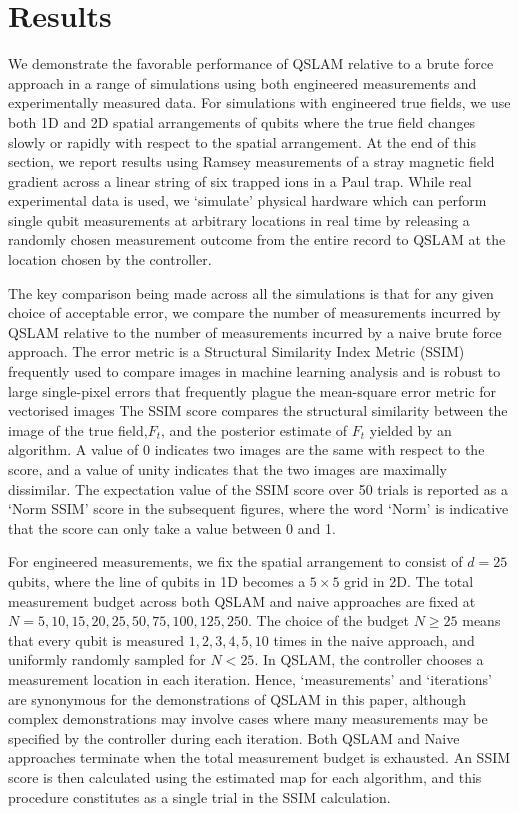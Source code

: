 \section{Results \label{sec:results}}

We demonstrate the favorable performance of QSLAM relative to a brute force approach in a range of simulations using both engineered measurements and  experimentally measured data. For simulations with engineered true fields, we use both 1D and 2D spatial arrangements of qubits where the true field changes slowly or rapidly with respect to the spatial arrangement. At the end of this section, we report results using Ramsey measurements of a stray magnetic field gradient across a linear string of six trapped ions in a Paul trap. While real experimental data is used, we `simulate' physical hardware which can perform single qubit measurements at arbitrary locations in real time by releasing a randomly chosen measurement outcome from the entire record to QSLAM at the location chosen by the controller.

The key comparison being made across all the simulations is that for any given choice of acceptable error, we compare the number of measurements incurred by QSLAM relative to the number of measurements incurred by a naive brute force approach. The error metric is a Structural Similarity Index Metric (SSIM) frequently used to compare images in machine learning analysis and is robust to large single-pixel errors that frequently plague the mean-square error metric for vectorised images \cite{wang2004image,chen2009similarity,wang2009mean} The SSIM score compares the structural similarity between the image of the true field,$F_t$, and the posterior estimate of $F_t$ yielded by an algorithm. A value of $0$ indicates two images are the same with respect to the score, and a value of unity indicates that the two images are maximally dissimilar.  The expectation value of the SSIM score over 50 trials is reported as a `Norm SSIM' score in the subsequent figures, where the word `Norm' is indicative that the score can only take a value between 0 and 1.  

For engineered measurements, we fix the spatial arrangement to consist of $d=25$ qubits, where the line of qubits in 1D becomes a $5\times 5$ grid in 2D. The total measurement budget across both QSLAM and naive approaches are fixed at $N = 5, 10, 15, 20, 25, 50, 75, 100, 125, 250$. The choice of the budget $N\geq25$ means that every qubit is measured $1, 2, 3, 4, 5, 10$ times in the naive approach, and uniformly randomly sampled for $N< 25$. In QSLAM, the controller chooses a measurement location in each iteration. Hence, `measurements' and `iterations' are synonymous for the demonstrations of QSLAM in this paper, although complex demonstrations may involve cases where many measurements may be specified by the controller during each iteration. Both QSLAM and Naive approaches terminate when the total measurement budget is exhausted. 	An SSIM score is then calculated using the estimated map for each algorithm, and this procedure constitutes as a single trial in the SSIM calculation.

